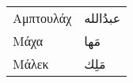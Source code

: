 \documentclass[twocolumn,a4paper]{article}
\newcommand{\ar}[1]{\textarabic{#1}}
\newcommand{\pl}{\raisebox{0.15ex}{\footnotesize ◍}}
\begin{document}
\begin{mpsupertabular}{ P{0.5\textwidth} P{0.5\textwidth} }

\end{mpsupertabular}


\clearpage

\begin{mpsupertabular}{ P{0.5\textwidth} P{0.5\textwidth} }
Αμπτουλάχ          & \ar{ عبدُالله } \\
Μάχα               & \ar{ مَها } \\
Μάλεκ              & \ar{ مَلِك } \\
\end{mpsupertabular}

\clearpage
\end{document}
